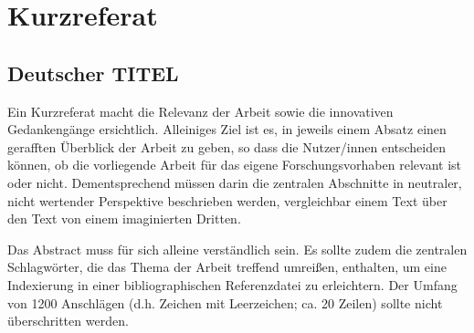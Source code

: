 \documentclass[./\jobname.tex]{subfiles}
\begin{document}
\setcounter{page}{2}
\chapter*{Kurzreferat}
\section*{Deutscher TITEL}
%
Ein Kurzreferat macht die Relevanz der Arbeit sowie die innovativen Gedankengänge ersichtlich. Alleiniges Ziel ist es, in jeweils einem Absatz einen gerafften Überblick der Arbeit zu geben, so dass die Nutzer/innen entscheiden können, ob die vorliegende Arbeit für das eigene Forschungsvorhaben relevant ist oder nicht. Dementsprechend müssen darin die zentralen Abschnitte in neutraler, nicht wertender Perspektive beschrieben werden, vergleichbar einem Text über den Text von einem imaginierten Dritten.\par
%
Das Abstract muss für sich alleine verständlich sein. Es sollte zudem die zentralen Schlagwörter, die das Thema der Arbeit treffend umreißen, enthalten, um eine Indexierung in einer bibliographischen Referenzdatei zu erleichtern. Der Umfang von 1200 Anschlägen (d.h. Zeichen mit Leerzeichen; ca. 20 Zeilen) sollte nicht überschritten werden.\par
%
\blindtext[2]
\end{document}
